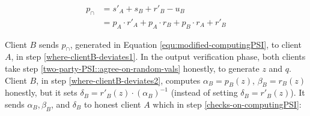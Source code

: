 \begin{equation}\label{equ:modified-computingPSI}
\begin{split}
 p_{\scriptscriptstyle \cap}&=s'_{\scriptscriptstyle A}+s_{\scriptscriptstyle B}+ r'_{\scriptscriptstyle B}-u_{\scriptscriptstyle B}\\   &=  p_{\scriptscriptstyle A}\cdot r'_{\scriptscriptstyle A}+p_{\scriptscriptstyle A}\cdot r_{\scriptscriptstyle B}+p_{\scriptscriptstyle B}\cdot r_{\scriptscriptstyle A}+ r'_{\scriptscriptstyle B}
 \end{split}
 \end{equation}

 
Client $B$ sends  $p_{\scriptscriptstyle \cap}$, generated in Equation \ref{equ:modified-computingPSI}, to client $A$, in step \ref{where-clientB-deviates1}. In the output verification phase, both clients take step \ref{two-party-PSI::agree-on-random-vals} honestly, to generate $z$ and $q$. Client $B$, in step \ref{where-clientB-deviates2},  computes $\alpha_{\scriptscriptstyle B}=p_{\scriptscriptstyle B}(z)$, $\beta_{\scriptscriptstyle B}=r_{\scriptscriptstyle B}(z)$ honestly, but it sets  $\delta_{\scriptscriptstyle B}=r'_{\scriptscriptstyle B}(z)\cdot (\alpha_{\scriptscriptstyle B})^{\scriptscriptstyle -1}$ (instead of setting $\delta_{\scriptscriptstyle B}=r'_{\scriptscriptstyle B}(z)$). It sends $\alpha_{\scriptscriptstyle B},\beta_{\scriptscriptstyle B}$, and $\delta_{\scriptscriptstyle B}$ to honest client $A$ which in step \ref{checks-on-computingPSI}: 


